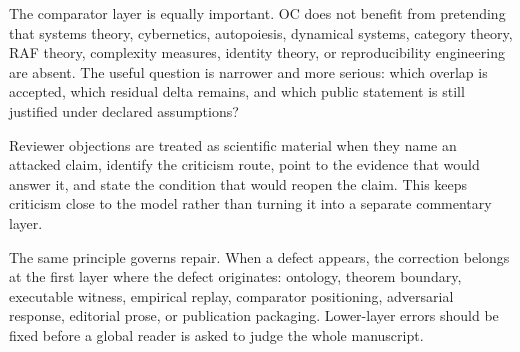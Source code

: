 The comparator layer is equally important. OC does not benefit from pretending that systems theory, cybernetics, autopoiesis, dynamical systems, category theory, RAF theory, complexity measures, identity theory, or reproducibility engineering are absent. The useful question is narrower and more serious: which overlap is accepted, which residual delta remains, and which public statement is still justified under declared assumptions?

Reviewer objections are treated as scientific material when they name an attacked claim, identify the criticism route, point to the evidence that would answer it, and state the condition that would reopen the claim. This keeps criticism close to the model rather than turning it into a separate commentary layer.

The same principle governs repair. When a defect appears, the correction belongs at the first layer where the defect originates: ontology, theorem boundary, executable witness, empirical replay, comparator positioning, adversarial response, editorial prose, or publication packaging. Lower-layer errors should be fixed before a global reader is asked to judge the whole manuscript.
